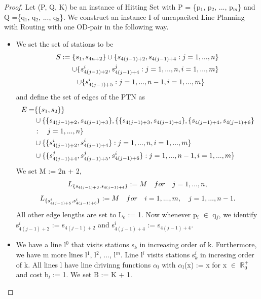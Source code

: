 \documentclass[
  twoside,
  11pt, a4paper,
  footinclude=true,
  headinclude=true,
  cleardoublepage=empty
]{scrbook}
\theoremstyle{definition}
\begin{document}
\begin{proof} 
Let (P, Q, K) be an instance of Hitting Set with P = \{p$_1$, p$_2$, ..., p$_m$\} and Q =\{q$_1$, q$_2$, ..., q$_3$\}. We construct an instance I of uncapacited Line Planning with Routing with one OD-pair in the following way.
\begin{itemize}
\item We set the set of stations to be 
\begin{equation} \notag
\begin{split}
S := \{s_1, s_{4n+2}\} \cup \{s_{4(j-1)+2}, s_{4(j-1)+4} : j = 1, ..., n\} \\ \cup \{s^i_{4(j-1)+2}, s^j_{4(j-1)+4} : j = 1, ..., n, i = 1, ..., m\} \\ \cup \{s^i_{4(j-1)+5} : j = 1, ..., n-1, i = 1, ..., m\} \quad \quad 
\end{split}
\end{equation}
and define the set of edges of the PTN as
\begin{equation} \notag
\begin{split}
E = &\{\{s_1, s_2\}\} \\ &\cup \{\{s_{4(j-1)+2}, s_{4(j-1)+3}\}, \{\{s_{4(j-1)+3}, s_{4(j-1)+4}\}, \{s_{4(j-1)+4}, s_{4(j-1)+6}\}\\ &: \quad j = 1, ..., n\} \\ \quad &\cup \{\{s^i_{4(j-1)+2}, s^i_{4(j-1)+4}\} : j = 1, ..., n, i = 1, ..., m\} \\ &\cup \{\{s^j_{4(j-1)+4}, s^j_{4(j-1)+5}, s^i_{4(j-1)+6}\} : j = 1, ..., n-1, i = 1, ..., m\}
\end{split}
\end{equation}
We set M := 2n + 2,
\begin{equation} \notag
L_{\{s_{4(j-1)+3},s_{4(j-1)+4}\}} := M \quad for \quad j = 1,..., n, 
\end{equation}
\begin{equation} \notag
L_{\{s^i_{4(j-1)+5},s^i_{4(j-1)+6}\}} := M \quad for \quad i = 1,..., m,\quad j = 1,..., n-1.
\end{equation}
All other edge lengths are set to L$_e$ := 1.\newline
Now whenever p$_i$ $\in$ q$_j$, we identify s$^i_{4(j-1)+2}$ := s$_{4(j-1)+2}$ and s$^i_{4(j-1)+4}$ := s$_{4(j-1)+4}$.
\item We have a line l$^0$ that visits stations s$_k$ in increasing order of k. Furthermore, we have m more lines l$^1$, l$^2$, ..., l$^m$. Line l$^i$ visits stations s$^i_k$ in incresing order of k. All lines l have line drivinng functions $\alpha_l$ with $\alpha_l$(x) := x for x $\in$ $\mathbb{R}^+_0$ and cost b$_l$ := 1. We set B := K + 1.

\end{itemize}
\end{proof}
\end{document}
